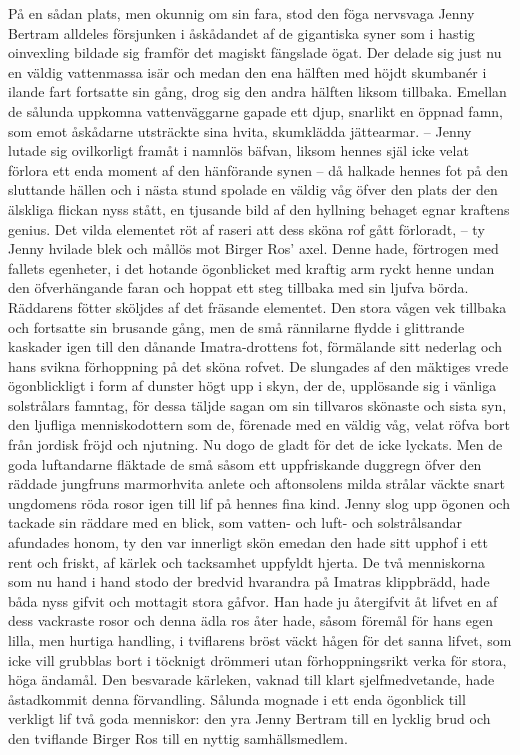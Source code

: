 På en sådan plats, men okunnig om sin fara, stod den föga nervsvaga
Jenny Bertram alldeles försjunken i åskådandet af de gigantiska syner
som i hastig oinvexling bildade sig framför det magiskt fängslade ögat.
Der delade sig just nu en väldig vattenmassa isär och medan den ena
hälften med höjdt skumbanér i ilande fart fortsatte sin gång, drog sig
den andra hälften liksom tillbaka. Emellan de sålunda uppkomna
vattenväggarne gapade ett djup, snarlikt en öppnad famn, som emot
åskådarne utsträckte sina hvita, skumklädda jättearmar. -- Jenny lutade
sig ovilkorligt framåt i namnlös bäfvan, liksom hennes själ icke velat
förlora ett enda moment af den hänförande synen -- då halkade hennes fot
på den sluttande hällen och i nästa stund spolade en väldig våg öfver
den plats der den älskliga flickan nyss stått, en tjusande bild af den
hyllning behaget egnar kraftens genius. Det vilda elementet röt af
raseri att dess sköna rof gått förloradt, -- ty Jenny hvilade blek och
mållös mot Birger Ros' axel. Denne hade, förtrogen med fallets
egenheter, i det hotande ögonblicket med kraftig arm ryckt henne undan
den öfverhängande faran och hoppat ett steg tillbaka med sin ljufva
börda. Räddarens fötter sköljdes af det fräsande elementet. Den stora
vågen vek tillbaka och fortsatte sin brusande gång, men de små
rännilarne flydde i glittrande kaskader igen till den dånande
Imatra-drottens fot, förmälande sitt nederlag och hans svikna
förhoppning på det sköna rofvet. De slungades af den mäktiges vrede
ögonblickligt i form af dunster högt upp i skyn, der de, upplösande sig
i vänliga solstrålars famntag, för dessa täljde sagan om sin tillvaros
skönaste och sista syn, den ljufliga menniskodottern som de, förenade
med en väldig våg, velat röfva bort från jordisk fröjd och njutning. Nu
dogo de gladt för det de icke lyckats. Men de goda luftandarne fläktade
de små såsom ett uppfriskande duggregn öfver den räddade jungfruns
marmorhvita anlete och aftonsolens milda strålar väckte snart ungdomens
röda rosor igen till lif på hennes fina kind. Jenny slog upp ögonen och
tackade sin räddare med en blick, som vatten- och luft- och
solstrålsandar afundades honom, ty den var innerligt skön emedan den
hade sitt upphof i ett rent och friskt, af kärlek och tacksamhet
uppfyldt hjerta. De två menniskorna som nu hand i hand stodo der bredvid
hvarandra på Imatras klippbrädd, hade båda nyss gifvit och mottagit
stora gåfvor. Han hade ju återgifvit åt lifvet en af dess vackraste
rosor och denna ädla ros åter hade, såsom föremål för hans egen lilla,
men hurtiga handling, i tviflarens bröst väckt hågen för det sanna
lifvet, som icke vill grubblas bort i töcknigt drömmeri utan
förhoppningsrikt verka för stora, höga ändamål. Den besvarade kärleken,
vaknad till klart sjelfmedvetande, hade åstadkommit denna förvandling.
Sålunda mognade i ett enda ögonblick till verkligt lif två goda
menniskor: den yra Jenny Bertram till en lycklig brud och den tviflande
Birger Ros till en nyttig samhällsmedlem.

